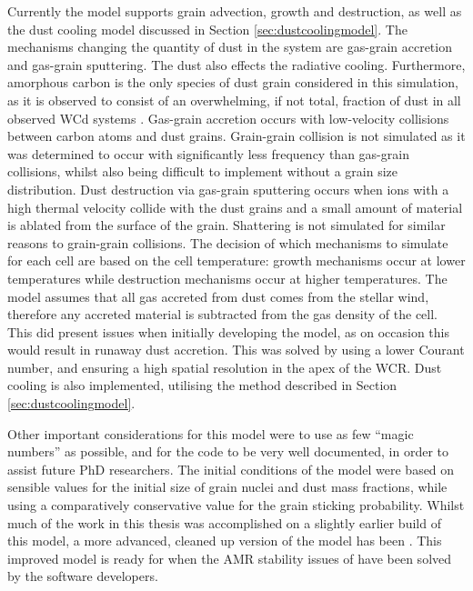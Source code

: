Currently the \bidmas{} model supports grain advection, growth and destruction, as well as the dust cooling model discussed in Section \ref{sec:dustcoolingmodel}.
The mechanisms changing the quantity of dust in the system are gas-grain accretion and gas-grain sputtering.
The dust also effects the radiative cooling.
Furthermore, amorphous carbon is the only species of dust grain considered in this simulation, as it is observed to consist of an overwhelming, if not total, fraction of dust in all observed WCd systems \parencite{crowther_dust_2003}.
Gas-grain accretion occurs with low-velocity collisions between carbon atoms and dust grains.
Grain-grain collision is not simulated as it was determined to occur with significantly less frequency than gas-grain collisions, whilst also being difficult to implement without a grain size distribution.
Dust destruction via gas-grain sputtering occurs when ions with a high thermal velocity collide with the dust grains and a small amount of material is ablated from the surface of the grain.
Shattering is not simulated for similar reasons to grain-grain collisions.
The decision of which mechanisms to simulate for each cell are based on the cell temperature: growth mechanisms occur at lower temperatures while destruction mechanisms occur at higher temperatures.
The \bidmas{} model assumes that all gas accreted from dust comes from the stellar wind, therefore any accreted material is subtracted from the gas density of the cell.
This did present issues when initially developing the model, as on occasion this would result in runaway dust accretion.
This was solved by using a lower Courant number, and ensuring a high spatial resolution in the apex of the WCR.
Dust cooling is also implemented, utilising the method described in Section \ref{sec:dustcoolingmodel}. 

Other important considerations for this model were to use as few ``magic numbers'' as possible, and for the code to be very well documented, in order to assist future PhD researchers.
The initial conditions of the model were based on sensible values for the initial size of grain nuclei and dust mass fractions, while using a comparatively conservative value for the grain sticking probability.
Whilst much of the work in this thesis was accomplished on a slightly earlier build of this model, a more advanced, cleaned up version of the model has been .
This improved model is ready for when the AMR stability issues of \athena{} have been solved by the software developers.

